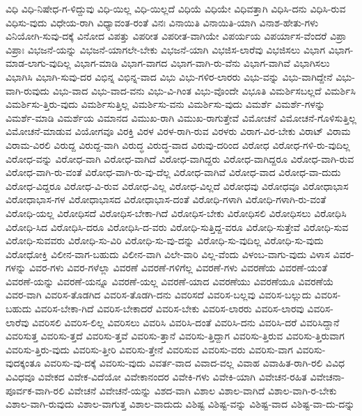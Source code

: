 {ವಿಧಿ
ವಿಧಿ-ನಿಷೇಧ-ಗ-ಳಿದ್ದುವು
ವಿಧಿ-ಯಿಲ್ಲ
ವಿಧಿ-ಯಿಲ್ಲದೆ
ವಿಧಿಯೆ
ವಿಧಿಯೇ
ವಿಧಿವತ್ತಾಗಿ
ವಿಧಿಸಿ-ದನು
ವಿಧಿಸಿ-ರುವ
ವಿಧಿಸು-ವುದು
ವಿಧೇಯ-ರಾಗಿ
ವಿಧ್ಯಾವಂತ-ರಂತೆ
ವಿನಃ
ವಿನಾಯಿತಿ
ವಿನಾಯಿತಿ-ಯಾಗಿ
ವಿನಾಶ-ಹೇತು-ಗಳು
ವಿನಿಯೋಗಿ-ಸುವು-ದಕ್ಕೆ
ವಿನೋದ
ವಿಪತ್ತು
ವಿಪರೀತ
ವಿಪರೀತ-ವಾಗಿಯೇ
ವಿಪರ್ಯಯ
ವಿಪರ್ಯಾಸ-ವೆಂದರೆ
ವಿಪ್ರಾ
ವಿಪ್ರಾಃ
ವಿಭಜನೆ-ಯನ್ನು
ವಿಭಜನೆ-ಯಾಗಲೇ-ಬೇಕು
ವಿಭಜನೆ-ಯಾಗಿ
ವಿಭಜಿಸ-ಲಾರೆವು
ವಿಭಜಿಸಲು
ವಿಭಾಗ
ವಿಭಾಗ-ಮಾಡ-ಲಾಗು-ವುದಿಲ್ಲ
ವಿಭಾಗ-ಮಾಡಿ
ವಿಭಾಗ-ವಾಗದ
ವಿಭಾಗ-ವಾಗಿ-ರು-ವೆನು
ವಿಭಾಗ-ವಾಗಿವೆ
ವಿಭಾಗಿಸಲು
ವಿಭಾಗಿಸಿ
ವಿಭಾಗಿ-ಸುವು-ದರ
ವಿಭಿನ್ನ
ವಿಭಿನ್ನ-ವಾದ
ವಿಭು
ವಿಭು-ಗಳಿರ-ಲಾರರು
ವಿಭು-ವನ್ನು
ವಿಭು-ವಾಗಿದ್ದೇನೆ
ವಿಭು-ವಾಗಿ-ರುವುದು
ವಿಭು-ವಾದ
ವಿಭು-ವಾದ-ವನು
ವಿಭು-ವಿ-ಗಿಂತ
ವಿಭು-ವೊಂದೇ
ವಿಭೂತಿ
ವಿಮರ್ಶಿಸಬಲ್ಲದೆ
ವಿಮರ್ಶಿಸಿ
ವಿಮರ್ಶಿಸು-ತ್ತಿರು-ವುದು
ವಿಮರ್ಶಿಸುತ್ತಿಲ್ಲ
ವಿಮರ್ಶಿಸು-ವನು
ವಿಮರ್ಶಿಸು-ವುದು
ವಿಮರ್ಶೆ
ವಿಮರ್ಶೆ-ಗಳನ್ನು
ವಿಮರ್ಶೆ-ಮಾಡಿ
ವಿಮರ್ಶೆಯ
ವಿಮಾನದ
ವಿಮುಖ-ರಾಗಿ
ವಿಮುಖ-ರಾಗುತ್ತೇವೆ
ವಿಮೋಚನೆ
ವಿಮೋಚನೆ-ಗೊಳಿಸುತ್ತಿಲ್ಲ
ವಿಮೋಚನೆ-ಮಾಡುವ
ವಿಯೋಗವೂ
ವಿರಕ್ತಿ
ವಿರಳ
ವಿರಳ-ರಾಗಿ-ರುವ
ವಿರಳರು
ವಿರಾಗ-ವಿರ-ಬೇಕು
ವಿರಾಟ್
ವಿರಾಮ
ವಿರಾಮ-ವಿರಲಿ
ವಿರುದ್ದ
ವಿರುದ್ದ-ವಾಗಿ
ವಿರುದ್ಧ
ವಿರುದ್ಧ-ವಾದ
ವಿರುವು-ದರಿಂದ
ವಿರೋಧ
ವಿರೋಧ-ಗಳಿ-ರು-ವುದಿಲ್ಲ
ವಿರೋಧ-ವನ್ನು
ವಿರೋಧ-ವಾಗಿ
ವಿರೋಧ-ವಾಗಿದೆ
ವಿರೋಧ-ವಾಗಿದ್ದರು
ವಿರೋಧ-ವಾಗಿದ್ದರೂ
ವಿರೋಧ-ವಾಗಿ-ರುವ
ವಿರೋಧ-ವಾಗಿ-ರು-ವಂತೆ
ವಿರೋಧ-ವಾಗಿ-ರು-ವು-ದೆಲ್ಲ
ವಿರೋಧ-ವಾಗಿವೆ
ವಿರೋಧ-ವಾದ
ವಿರೋಧ-ವಾ-ದುದು
ವಿರೋಧ-ವಿದ್ದರೂ
ವಿರೋಧ-ವಿ-ರುವ
ವಿರೋಧ-ವಿಲ್ಲ
ವಿರೋಧ-ವಿಲ್ಲದೆ
ವಿರೋಧವು
ವಿರೋಧವೂ
ವಿರೋಧಾಭಾಸ
ವಿರೋಧಾಭಾಸ-ಗಳ
ವಿರೋಧಾಭಾಸದ
ವಿರೋಧಾಭಾಸ-ದಂತೆ
ವಿರೋಧಿ-ಗಳಾಗಿ
ವಿರೋಧಿ-ಗಳಾಗಿ-ರು-ವಂತೆ
ವಿರೋಧಿ-ಯಲ್ಲ
ವಿರೋಧಿಸದೆ
ವಿರೋಧಿಸ-ಬೇಕಾ-ಗಿದೆ
ವಿರೋಧಿಸ-ಬೇಕು
ವಿರೋಧಿಸಲಿ
ವಿರೋಧಿಸಲು
ವಿರೋಧಿಸಿ
ವಿರೋಧಿ-ಸಿದ
ವಿರೋಧಿಸಿ-ದರೂ
ವಿರೋಧಿಸಿ-ದ-ವರು
ವಿರೋಧಿ-ಸುತ್ತಿದ್ದ-ವರೂ
ವಿರೋಧಿ-ಸುತ್ತೇವೆ
ವಿರೋಧಿ-ಸುವ
ವಿರೋಧಿ-ಸುವವರು
ವಿರೋಧಿ-ಸು-ವಿರಿ
ವಿರೋಧಿ-ಸು-ವು-ದನ್ನು
ವಿರೋಧಿ-ಸು-ವುದಿಲ್ಲ
ವಿರೋಧಿ-ಸು-ವುದು
ವಿರೋಧೋಕ್ತಿ
ವಿಲೀನ-ವಾಗ-ಬಹುದು
ವಿಲೀನ-ವಾಗಿ
ವಿಲೇ-ವಾರಿ
ವಿಲ್ಲ-ವೆಂದು
ವಿಳಂಬ-ವಾಗು-ವುದು
ವಿಳಾಸ
ವಿವರ-ಗಳನ್ನು
ವಿವರ-ಗಳು
ವಿವರ-ಗಳೆಲ್ಲಾ
ವಿವರಣೆ
ವಿವರಣೆ-ಗಳಿಗೆಲ್ಲ
ವಿವರಣೆ-ಗಳು
ವಿವರಣೆಯ
ವಿವರಣೆ-ಯಂತೆ
ವಿವರಣೆ-ಯನ್ನು
ವಿವರಣೆ-ಯನ್ನೂ
ವಿವರಣೆ-ಯಲ್ಲ
ವಿವರಣೆ-ಯಾದ
ವಿವರಣೆಯು
ವಿವರಣೆಯೂ
ವಿವರಣೆಯೆ
ವಿವರ-ವಾಗಿ
ವಿವರಿಸ-ತೊಡಗಿದ
ವಿವರಿಸ-ತೊಡಗಿ-ದನು
ವಿವರಿಸದೆ
ವಿವರಿಸ-ಬಲ್ಲವು
ವಿವರಿಸ-ಬಲ್ಲುದು
ವಿವರಿಸ-ಬಹುದು
ವಿವರಿಸ-ಬೇಕಾ-ಗಿದೆ
ವಿವರಿಸ-ಬೇಕಾದರೆ
ವಿವರಿಸ-ಬೇಕು
ವಿವರಿಸ-ಲಾರರು
ವಿವರಿಸ-ಲಾರವು
ವಿವರಿಸ-ಲಾರೆವು
ವಿವರಿಸಲಿ
ವಿವರಿಸ-ಲಿಲ್ಲ
ವಿವರಿಸಲು
ವಿವರಿಸಿ
ವಿವರಿಸಿ-ದಂತೆ
ವಿವರಿಸಿ-ದನು
ವಿವರಿಸಿ-ದರೆ
ವಿವರಿಸಿದ್ದಾನೆ
ವಿವರಿಸುತ್ತ
ವಿವರಿಸು-ತ್ತದೆ
ವಿವರಿಸು-ತ್ತವೆ
ವಿವರಿಸು-ತ್ತಾನೆ
ವಿವರಿಸು-ತ್ತಿದ್ದಾಗ
ವಿವರಿಸು-ತ್ತಿರುವ
ವಿವರಿಸು-ತ್ತಿರುವಾಗ
ವಿವರಿಸು-ತ್ತಿರು-ವುದು
ವಿವರಿಸು-ತ್ತೀರಿ
ವಿವರಿಸು-ತ್ತೇನೆ
ವಿವರಿಸುವ
ವಿವರಿಸು-ವರು
ವಿವರಿಸು-ವಾಗ
ವಿವರಿಸು-ವುದಕ್ಕಂತೂ
ವಿವರಿಸು-ವು-ದಕ್ಕೆ
ವಿವರಿಸು-ವುದು
ವಿವರ್ತ-ವಾದ
ವಿವಾದ-ವಲ್ಲ
ವಿವಾಹ
ವಿವಾಹಿತ-ರಾಗಿ-ರಲಿ
ವಿವಿಧ
ವಿವಿಧವೂ
ವಿವೇಕದ
ವಿವೇಕ-ವಿದೆಯೋ
ವಿವೇಕಾನಂದರ
ವಿವೇಕಿ-ಗಳು
ವಿವೇಕಿ-ಯಾಗಿ
ವಿವೇಚನ-ರಹಿತ
ವಿವೇಚನಾ-ಪೂರ್ವಕ-ವಾಗಿ-ರಲಿ
ವಿವೇಚನೆ
ವಿವೇಚನೆ-ಯನ್ನು
ವಿಶದ-ವಾಗಿ
ವಿಶಾಲ
ವಿಶಾಲ-ವಾಗಿದೆ
ವಿಶಾಲ-ವಾಗಿ-ರ-ಬೇಕು
ವಿಶಾಲ-ವಾಗಿ-ರುವುದು
ವಿಶಾಲ-ವಾಗುತ್ತ
ವಿಶಾಲ-ವಾದುದು
ವಿಶಿಷ್ಟ
ವಿಶಿಷ್ಟ-ವನ್ನು
ವಿಶಿಷ್ಟ-ವಾದ
ವಿಶಿಷ್ಟ-ವಾ-ದು-ದನ್ನು
}
